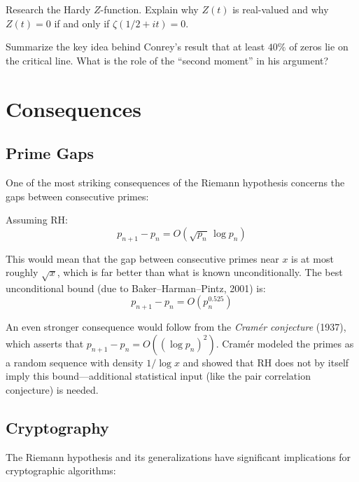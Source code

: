 \begin{exercise}
\label{ex:hardy}
Research the Hardy $Z$-function. Explain why $Z(t)$ is real-valued and why $Z(t) = 0$ if and only if $\zeta(1/2 + it) = 0$.
\end{exercise}

\begin{exercise}
\label{ex:conrey40}
Summarize the key idea behind Conrey's result that at least $40\%$ of zeros lie on the critical line. What is the role of the ``second moment'' in his argument?
\end{exercise}

\section{Consequences}
\label{sec:consequences}

\subsection{Prime Gaps}

One of the most striking consequences of the Riemann hypothesis concerns the gaps between consecutive primes:

\begin{theorem}
Assuming RH:
\[
p_{n+1} - p_n = O(\sqrt{p_n} \, \log p_n)
\]
\end{theorem}

This would mean that the gap between consecutive primes near $x$ is at most roughly $\sqrt{x}$, which is far better than what is known unconditionally. The best unconditional bound (due to Baker--Harman--Pintz, 2001) is:
\[
p_{n+1} - p_n = O(p_n^{0.525})
\]

An even stronger consequence would follow from the \textit{Cram\'{e}r conjecture} (1937), which asserts that $p_{n+1} - p_n = O((\log p_n)^2)$. Cram\'{e}r modeled the primes as a random sequence with density $1/\log x$ and showed that RH does not by itself imply this bound---additional statistical input (like the pair correlation conjecture) is needed.

\subsection{Cryptography}

The Riemann hypothesis and its generalizations have significant implications for cryptographic algorithms:

